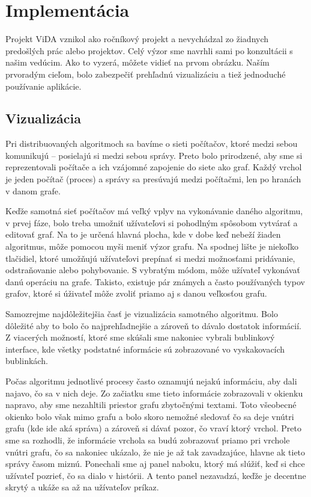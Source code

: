 \section{Implementácia}

Projekt ViDA vznikol ako ročníkový projekt a nevychádzal zo žiadnych predošlých prác alebo
projektov. Celý výzor sme navrhli sami po konzultácii s našim vedúcim. Ako to vyzerá, môžete vidieť
na prvom obrázku. Naším prvoradým cieľom, bolo zabezpečiť prehľadnú vizualizáciu a tiež jednoduché
používanie aplikácie.

\subsection{Vizualizácia}

Pri distribuovaných algoritmoch sa bavíme o sieti počítačov, ktoré medzi sebou komunikujú --
posielajú si medzi sebou správy. Preto bolo prirodzené, aby sme si reprezentovali počítače a ich
vzájomné zapojenie do siete ako graf. Každý vrchol je jeden počítač (proces) a správy sa presúvajú
medzi počítačmi, len po hranách v danom grafe.

Keďže samotná sieť počítačov má veľký vplyv na vykonávanie daného algoritmu, v prvej fáze, bolo
treba umožniť užívateľovi si pohodlným spôsobom vytvárať a editovať graf. Na to je určená hlavná
plocha, kde v dobe keď nebeží žiaden algoritmus, môže pomocou myši meniť výzor grafu. Na spodnej
lište je niekoľko tlačidiel, ktoré umožňujú užívateľovi prepínať si medzi možnosťami pridávanie,
odstraňovanie alebo pohybovanie. S vybratým módom, môže užívateľ vykonávať danú operáciu na grafe.
Takisto, existuje pár známych a často používaných typov grafov, ktoré si úživateľ môže zvoliť priamo
aj s danou veľkosťou grafu.

Samozrejme najdôležitejšia časť je vizualizácia samotného algoritmu. Bolo dôležité aby to bolo čo
najprehľadnejšie a zároveň to dávalo dostatok informácií. Z viacerých možností, ktoré sme skúšali
sme nakoniec vybrali bublinkový interface, kde všetky podstatné informácie sú zobrazované vo
vyskakovacích bublinkách.

Počas algoritmu jednotlivé procesy často oznamujú nejakú informáciu, aby dali najavo, čo sa v nich
deje. Zo začiatku sme tieto informácie zobrazovali v okienku napravo, aby sme nezahltili priestor
grafu zbytočnými textami. Toto všeobecné okienko bolo však mimo grafu a bolo skoro nemožné sledovať
čo sa deje vnútri grafu (kde ide aká správa) a zároveň si dávať pozor, čo vraví ktorý vrchol. Preto
sme sa rozhodli, že informácie vrchola sa budú zobrazovať priamo pri vrchole vnútri grafu, čo sa
nakoniec ukázalo, že nie je až tak zavadzajúce, hlavne ak tieto správy časom miznú. Ponechali sme aj
panel naboku, ktorý má slúžiť, keď si chce užívateľ pozrieť, čo sa dialo v histórii. A tento panel
nezavadzá, keďže je decentne skrytý a ukáže sa až na užívateľov príkaz.

